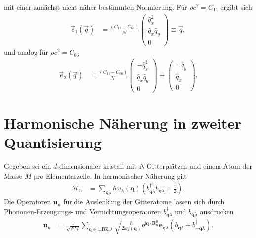 \documentclass[english, parskip=full]{scrartcl}
\newcommand{\kla}{}
\newcommand{\tecxt}{}
\renewcommand{\i}{\text{i}}
\newcommand{\e}{\text{e}}
\begin{document}
mit einer zunächst nicht näher bestimmten Normierung.
Für $\rho c^2 = C_{11}$ ergibt sich
\begin{align}
\vec{e}_1(\vec{q}) &= \frac{(C_{11} - C_{66})}{\mathcal{N}} \begin{pmatrix}
\hat{q}_x^2 \\ \hat{q}_x\hat{q}_y \\ 0
\end{pmatrix} \equiv \vec{q},
\end{align}
und analog für $\rho c^2 = C_{66}$ 
\begin{align}
\vec{e}_2(\vec{q}) &= \frac{(C_{11} - C_{66})}{\mathcal{N}} \begin{pmatrix}
-\hat{q}_y^2 \\ \hat{q}_x\hat{q}_y \\ 0
\end{pmatrix} \equiv \begin{pmatrix}
-\hat{q}_y \\ \hat{q}_x \\ 0
\end{pmatrix}.
\end{align}

\section{Harmonische Näherung in zweiter Quantisierung}
Gegeben sei ein $d$-dimensionaler kristall mit $N$ Gitterplätzen und einem Atom der Masse $M$ pro Elementarzelle.
In harmonischer Näherung gilt
\begin{align}
\mathcal{H}_\tecxt\text{h} &= \sum_{\textbf{q} \lambda} \hbar\omega_\lambda (\textbf{q}) \kla\left( b^\dagger_{\textbf{q} \lambda} b_{\textbf{q} \lambda} + \frac{1}{2} \right).
\end{align}
Die Operatoren $\textbf{u}_n$ für die Auslenkung der Gitteratome lassen sich durch Phononen-Erzeugungs- und Vernichtungsoperatoren $b_{\textbf{q} \lambda}^\dagger$ und $b_{\textbf{q} \lambda}$ ausdrücken
\begin{align}
\textbf{u}_n &= \frac{1}{\sqrt{NM}} \sum_{\textbf{q} \in \tecxt\text{1.BZ}, \lambda} \sqrt{\frac{\hbar}{2\omega_\lambda(\textbf{q})}}  \e^{\i \textbf{q}\cdot \textbf{R}_n^0} \textbf{e}_{\textbf{q} \lambda} \kla\left( b_{\textbf{q} \lambda} + b^\dagger_{-\textbf{q} \lambda} \right).
\end{align}
\end{document}
